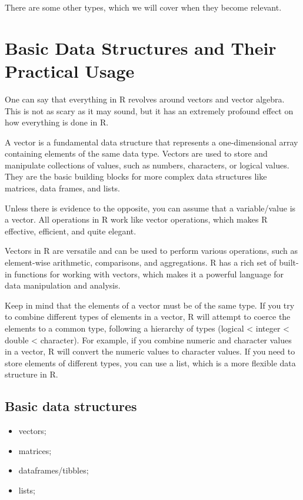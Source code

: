 \documentclass[
]{book}
\providecommand{\tightlist}{%
  \setlength{\itemsep}{0pt}\setlength{\parskip}{0pt}}
\begin{document}
There are some other types, which we will cover when they become relevant.

\hypertarget{basic-data-structures-and-their-practical-usage}{%
\section{Basic Data Structures and Their Practical Usage}\label{basic-data-structures-and-their-practical-usage}}

One can say that everything in R revolves around vectors and vector algebra. This is not as scary as it may sound, but it has an extremely profound effect on how everything is done in R.

A vector is a fundamental data structure that represents a one-dimensional array containing elements of the same data type. Vectors are used to store and manipulate collections of values, such as numbers, characters, or logical values. They are the basic building blocks for more complex data structures like matrices, data frames, and lists.

Unless there is evidence to the opposite, you can assume that a variable/value is a vector. All operations in R work like vector operations, which makes R effective, efficient, and quite elegant.

Vectors in R are versatile and can be used to perform various operations, such as element-wise arithmetic, comparisons, and aggregations. R has a rich set of built-in functions for working with vectors, which makes it a powerful language for data manipulation and analysis.

Keep in mind that the elements of a vector must be of the same type. If you try to combine different types of elements in a vector, R will attempt to coerce the elements to a common type, following a hierarchy of types (logical \textless{} integer \textless{} double \textless{} character). For example, if you combine numeric and character values in a vector, R will convert the numeric values to character values. If you need to store elements of different types, you can use a list, which is a more flexible data structure in R.

\hypertarget{basic-data-structures}{%
\subsection{Basic data structures}\label{basic-data-structures}}

\begin{itemize}
\tightlist
\item
  vectors;
\item
  matrices;
\item
  dataframes/tibbles;
\item
  lists;
\end{itemize}
\end{document}
